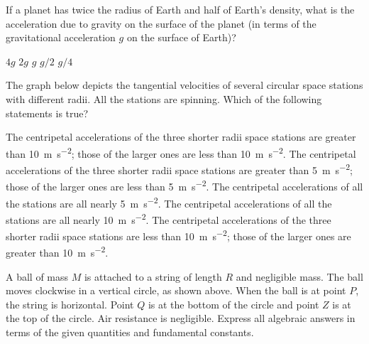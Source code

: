 \documentclass{../../../oss-ap12ibhl-print}
\begin{document}
\begin{questions}
  \question If a planet has twice the radius of Earth and half of Earth's
  density, what is the acceleration due to gravity on the surface of the planet
  (in terms of the gravitational acceleration $g$ on the surface of Earth)?
  \begin{choices}
    \choice $4g$
    \choice $2g$
    \choice $g$
    \choice $g/2$
    \choice $g/4$
  \end{choices}

  \question The graph below depicts the tangential velocities of several
  circular space stations with different radii. All the stations are spinning.
  Which of the following statements is true?
  \begin{choices}
    \choice The centripetal accelerations of the three shorter radii space
    stations are greater than \SI{10}{\metre\per\second\squared}; those of
    the larger ones are less than \SI{10}{\metre\per\second\squared}.
    \choice  The centripetal accelerations of the three shorter radii space
    stations are greater than \SI{5}{\metre\per\second\squared}; those of
      the larger ones are less than \SI{5}{\metre\per\second\squared}.
      \choice The centripetal accelerations of all the stations are all nearly
      \SI{5}{\metre\per\second\squared}.
      \choice The centripetal accelerations of all the stations are all nearly
      \SI{10}{\metre\per\second\squared}.
      \choice The centripetal accelerations of the three shorter radii space
      stations are less than \SI{10}{\metre\per\second\squared}; those of the
      larger ones are greater than \SI{10}{\metre\per\second\squared}.
  \end{choices}
  \newpage
  

  \question A ball of mass $M$ is attached to a string of length $R$ and
  negligible mass. The ball moves clockwise in a vertical circle, as shown
  above. When the ball is at point $P$, the string is horizontal. Point $Q$ is
  at the bottom of the circle and point $Z$ is at the top of the circle. Air
  resistance is negligible. Express all algebraic answers in terms of the given
  quantities and fundamental constants.
  \begin{parts}

\end{parts}
\end{questions}
\end{document}
